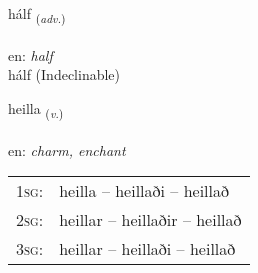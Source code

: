 \documentclass[frontgrid, backgrid]{flacards}\usepackage[]{graphicx}\usepackage[]{xcolor}
\begin{document}

\renewcommand{\flhead}{\vskip5pt \fboxsep=0pt {\small\bfseries\footnotesize Atviksorð | Adverb}}
\renewcommand{\fcfoot}{\vskip5pt \fboxsep=0pt \hspace{2pt}{\small\bfseries\footnotesize 3K}}

\renewcommand{\blhead}{\vskip5pt {\small\bfseries\footnotesize Atviksorð | Adverb }}
\renewcommand{\bcfoot}{\vskip5pt \hspace{2pt}{\small\bfseries\footnotesize 3K}}


{hálf \small{\textsubscript{(\textit{adv.})}} \\[1ex]
\textphonetic{[haulv]} \\
en: \emph{half} \\  [2ex]
hálf (Indeclinable)}

\renewcommand{\flhead}{\vskip5pt \fboxsep=0pt {\small\bfseries\footnotesize Sagnorð | Verb}}
\renewcommand{\fcfoot}{\vskip5pt \fboxsep=0pt \hspace{2pt}{\small\bfseries\footnotesize 3K}}

\renewcommand{\blhead}{\vskip5pt {\small\bfseries\footnotesize Sagnorð | Verb }}
\renewcommand{\bcfoot}{\vskip5pt \hspace{2pt}{\small\bfseries\footnotesize 3K}}


{heilla \small{\textsubscript{(\textit{v.})}} \\[1ex] %
\textphonetic{[heitla]} \\
en: \emph{charm, enchant} \\  [2ex]
\renewcommand*{\arraystretch}{0.8}
\begin{tabular}{p{1cm}l}
\textsc{1sg}: & heilla -- heillaði -- heillað \\ 
\textsc{2sg}: & heillar -- heillaðir -- heillað \\ 
\textsc{3sg}: & heillar -- heillaði -- heillað \\ 
\end{tabular}
}
\end{document}
